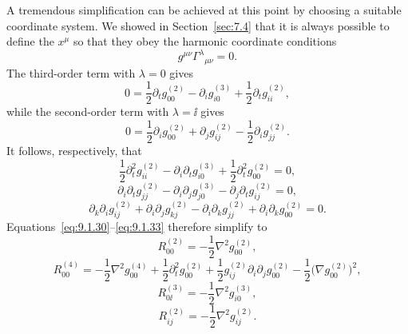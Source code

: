A tremendous simplification can be achieved at this point by choosing a
suitable coordinate system. We showed in Section~\ref{sec:7.4} that it is
always possible to define the \(x^\mu\) so that they obey the harmonic
coordinate conditions
\begin{equation}
  g^{\mu\nu}\Gamma^\lambda{}_{\mu\nu}=0.
  \tag{9.1.34}\label{eq:9.1.34}
\end{equation}
The third-order term with \(\lambda=0\) gives
\begin{equation}
  0=
  \frac12\partial_tg_{00}^{(2)}
  -\partial_i g_{i0}^{(3)}
  +\frac12\partial_tg_{ii}^{(2)},
  \tag{9.1.35}\label{eq:9.1.35}
\end{equation}
while the second-order term with \(\lambda=\ii\) gives
\begin{equation}
  0=
  \frac12\partial_i g_{00}^{(2)}
  +\partial_jg_{ij}^{(2)}
  -\frac12\partial_i g_{jj}^{(2)}.
  \tag{9.1.36}\label{eq:9.1.36}
\end{equation}
It follows, respectively, that
\[
  \frac12\partial_t^2g_{ii}^{(2)}
  -\partial_i\partial_tg_{i0}^{(3)}
  +\frac12\partial_t^2g_{00}^{(2)}=0,
\]
\[
  \partial_i\partial_tg_{jj}^{(2)}
  -\partial_i\partial_jg_{j0}^{(3)}
  -\partial_j\partial_tg_{ij}^{(2)}=0,
\]
\[
  \partial_k\partial_i g_{ij}^{(2)}
  +\partial_i\partial_jg_{kj}^{(2)}
  -\partial_i\partial_k g_{jj}^{(2)}
  +\partial_i\partial_k g_{00}^{(2)}=0.
\]
Equations~\eqref{eq:9.1.30}--\eqref{eq:9.1.33} therefore simplify to
\begin{equation}
  R_{00}^{(2)}=-\frac12\nabla^2g_{00}^{(2)},
  \tag{9.1.37}\label{eq:9.1.37}
\end{equation}
\begin{equation}
  R_{00}^{(4)}
  =
  -\frac12\nabla^2g_{00}^{(4)}
  +\frac12\partial_t^2g_{00}^{(2)}
  +\frac12g_{ij}^{(2)}\partial_i\partial_jg_{00}^{(2)}
  -\frac12\bigl(\nabla g_{00}^{(2)}\bigr)^2,
  \tag{9.1.38}\label{eq:9.1.38}
\end{equation}
\begin{equation}
  R_{0\ii}^{(3)}=-\frac12\nabla^2g_{i0}^{(3)},
  \tag{9.1.39}\label{eq:9.1.39}
\end{equation}
\begin{equation}
  R_{ij}^{(2)}=-\frac12\nabla^2g_{ij}^{(2)}.
  \tag{9.1.40}\label{eq:9.1.40}
\end{equation}

